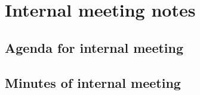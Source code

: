 \chapter{Internal meeting notes}
\label{AppendixF}

\section{Agenda for internal meeting}

\section{Minutes of internal meeting}